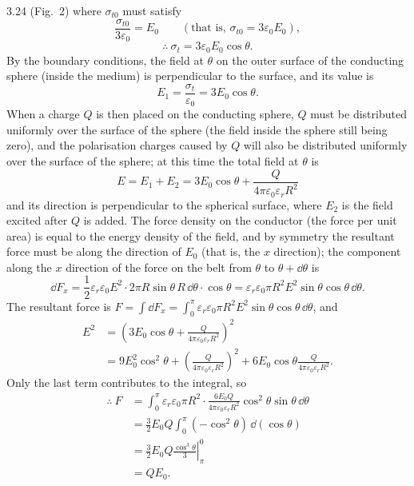 \begin{solution}{3.24}
(Fig.~2) where $\sigma_{t0}$ must satisfy
\[
\frac{\sigma_{t0}}{3\varepsilon_0}=E_0
\qquad(\text{that is, }\sigma_{t0}=3\varepsilon_0E_0),
\]
\[
\therefore\ \sigma_t=3\varepsilon_0E_0\cos\theta.
\]
By the boundary conditions, the field at $\theta$ on the outer surface of the conducting sphere (inside the medium) is perpendicular to the surface, and its value is
\[
E_1=\frac{\sigma_t}{\varepsilon_0}=3E_0\cos\theta.
\]
When a charge $Q$ is then placed on the conducting sphere, $Q$ must be distributed uniformly over the surface of the sphere (the field inside the sphere still being zero), and the polarisation charges caused by $Q$ will also be distributed uniformly over the surface of the sphere; at this time the total field at $\theta$ is
\begin{equation}
E=E_1+E_2=3E_0\cos\theta+\frac{Q}{4\pi\varepsilon_0\varepsilon_rR^2} \tag{2}
\end{equation}
and its direction is perpendicular to the spherical surface, where $E_2$ is the field excited after $Q$ is added. The force density on the conductor (the force per unit area) is equal to the energy density of the field, and by symmetry the resultant force must be along the direction of $E_0$ (that is, the $x$ direction); the component along the $x$ direction of the force on the belt from $\theta$ to $\theta+\dd\theta$ is
\[
\dd F_x=\frac{1}{2}\varepsilon_r\varepsilon_0E^2\cdot2\pi R\sin\theta\,R\,\dd\theta\cdot\cos\theta
=\varepsilon_r\varepsilon_0\pi R^2E^2\sin\theta\cos\theta\,\dd\theta.
\]
The resultant force is $F=\displaystyle\int\dd F_x=\int_0^\pi\varepsilon_r\varepsilon_0\pi R^2E^2\sin\theta\cos\theta\,\dd\theta$, and
\begin{align*}
E^2&=\left(3E_0\cos\theta+\frac{Q}{4\pi\varepsilon_0\varepsilon_rR^2}\right)^2\\
&=9E_0^2\cos^2\theta+\left(\frac{Q}{4\pi\varepsilon_0\varepsilon_rR^2}\right)^2
+6E_0\cos\theta\frac{Q}{4\pi\varepsilon_0\varepsilon_rR^2}.
\end{align*}
Only the last term contributes to the integral, so
\begin{align*}
\therefore\ F&=\int_0^\pi\varepsilon_r\varepsilon_0\pi R^2\cdot
\frac{6E_0Q}{4\pi\varepsilon_0\varepsilon_rR^2}\cos^2\theta\sin\theta\,\dd\theta\\
&=\frac{3}{2}E_0Q\int_0^\pi(-\cos^2\theta)\,\dd(\cos\theta)\\
&=\frac{3}{2}E_0Q\left.\frac{\cos^3\theta}{3}\right|_\pi^0\\
&=QE_0.
\end{align*}
\end{solution}

